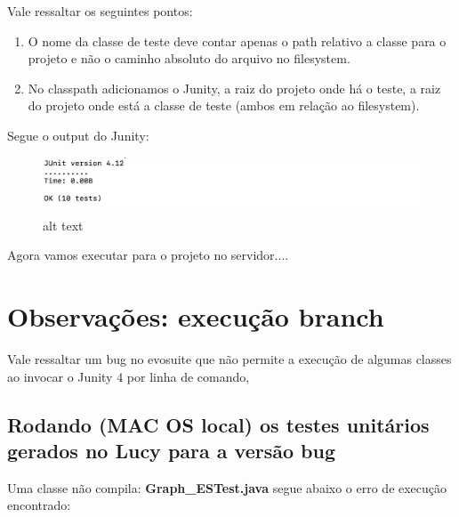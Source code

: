 \documentclass[11pt]{article}
\makeatletter
\def\maxwidth{\ifdim\Gin@nat@width>\linewidth\linewidth
    \else\Gin@nat@width\fi}
\let\Oldincludegraphics\includegraphics
\renewcommand{\includegraphics}[1]{\Oldincludegraphics[width=.8\maxwidth]{#1}}
\newenvironment{Shaded}{}{}
\newcommand{\StringTok}[1]{\textcolor[rgb]{0.25,0.44,0.63}{{#1}}}
\newcommand{\FunctionTok}[1]{\textcolor[rgb]{0.02,0.16,0.49}{{#1}}}
\newcommand{\NormalTok}[1]{{#1}}
\newcommand{\VariableTok}[1]{\textcolor[rgb]{0.10,0.09,0.49}{{#1}}}
\newcommand{\ExtensionTok}[1]{{#1}}
\makeatother
\begin{document}
    Vale ressaltar os seguintes pontos:

\begin{enumerate}
\def\labelenumi{\arabic{enumi}.}
\item
  O nome da classe de teste deve contar apenas o path relativo a classe
  para o projeto e não o caminho absoluto do arquivo no filesystem.
\item
  No classpath adicionamos o Junity, a raiz do projeto onde há o teste,
  a raiz do projeto onde está a classe de teste (ambos em relação ao
  filesystem).
\end{enumerate}

    Segue o output do Junity:

    \begin{figure}
\centering
\includegraphics{pic/outputJunity.png}
\caption{alt text}
\end{figure}
Agora vamos executar para o projeto no servidor....
    \hypertarget{observauxe7uxf5es-execuuxe7uxe3o-branch}{%
\section{Observações: execução
branch}\label{observauxe7uxf5es-execuuxe7uxe3o-branch}}

    Vale ressaltar um bug no evosuite que não permite a execução de algumas
classes ao invocar o Junity \(4\) por linha de comando,

    \hypertarget{rodando-mac-os-local-os-testes-unituxe1rios-gerados-no-lucy-para-a-versuxe3o-bug}{%
\subsection{Rodando (MAC OS local) os testes unitários gerados no Lucy
para a versão
bug}\label{rodando-mac-os-local-os-testes-unituxe1rios-gerados-no-lucy-para-a-versuxe3o-bug}}

    Uma classe não compila: \textbf{Graph\_ESTest.java} segue abaixo o erro
de execução encontrado:

    \begin{Shaded}
\end{Shaded}
\end{document}
